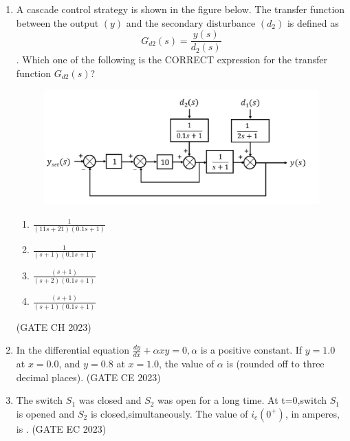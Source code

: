 \begin{enumerate}[label=\thechapter.\arabic*,ref=\thechapter.\theenumi]
\newpage
\item  A cascade control strategy is shown in the figure below. The transfer function between the output $(y)$ and the secondary disturbance $(d_2)$ is defined as  \\
$$G_{d2}(s)= \frac{y(s)}{d_2(s)}$$. 
Which one of the following is the CORRECT expression for the transfer function $G_{d2}(s)$? \\
\begin{figure}[h]
    \centering
    \includegraphics[scale=0.25]{2023/CH/44/figs/g44fig1.jpeg}
    \caption{ }
    \label{}
\end{figure}
\begin{enumerate}[label=\Alph*.]
\item $\frac{1}{(11s+21)(0.1s+1)}$ 
\item $\frac{1}{(s+1)(0.1s+1)}$
\item $\frac{(s+1)}{(s+2)(0.1s+1)}$
\item $\frac{(s+1)}{(s+1)(0.1s+1)}$
\end{enumerate} \hfill (GATE CH 2023)
\solution

\newpage
\item In the differential equation $\frac{dy}{dx} + \alpha x y = 0, \alpha$ is a positive constant. If $y = 1.0$ at
$x = 0.0$, and $y = 0.8$ at $x = 1.0$, the value of $\alpha$ is (rounded off to three decimal places).  \hfill(GATE CE 2023)
\solution

\newpage
\item The switch $S_1$ was closed and $S_2$ was open for a long time. At t=0,switch $S_1$ is opened and $S_2$ is closed,simultaneously. The value of $i_c(0^{+})$, in amperes, is . \hfill (GATE EC 2023)\\

\newpage


\end{enumerate}
